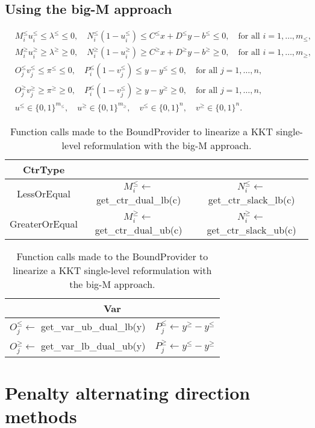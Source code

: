 \subsection{Using the big-M approach}

\begin{align*}
    & M_i^\le u^\le_i \le \lambda^\le \le 0, 
    \quad N_i^\le(1 - u_i^\le) \le C^\le x + D^\le y - b^\le \le 0,  \quad \text{for all } i=1,\dotsc,m_\le,\\
    & M_i^\ge u^\ge_i \ge \lambda^\ge \ge 0, 
    \quad N_i^\ge(1 - u_i^\ge) \ge C^\ge x + D^\ge y - b^\ge \ge 0,  \quad \text{for all } i=1,\dotsc,m_\ge,\\
    & O_j^\le v_j^\le \le \pi^\le \le 0, 
    \quad P_i^\le(1 - v_j^\le) \le y - y^\le \le 0, \quad \text{for all }j=1,\dotsc,n, \\
    & O_j^\ge v_j^\ge \ge \pi^\ge \ge 0, 
    \quad P_i^\le(1 - v_j^\le) \ge y - y^\ge \ge 0, \quad \text{for all }j=1,\dotsc,n, \\
    & u^\le\in\{0,1\}^{m_\le}, \quad u^\ge\in\{0,1\}^{m_\ge}, \quad 
    v^\le\in\{0,1\}^{n}, \quad v^\ge\in\{0,1\}^{n}.
\end{align*}

\begin{table}
    \centering 

    \begin{tabular}{ccc}
        \toprule
        \textsf{CtrType} \\\midrule
        \textsf{LessOrEqual} 
        & $M_i^\le \gets $ \textsf{get\_ctr\_dual\_lb(c)}
        & $N_i^\le \gets $ \textsf{get\_ctr\_slack\_lb(c)} \\
        \textsf{GreaterOrEqual} 
        & $M_i^\ge \gets $ \textsf{get\_ctr\_dual\_ub(c)}
        & $N_i^\ge \gets $ \textsf{get\_ctr\_slack\_ub(c)} \\\bottomrule
    \end{tabular}

    \vspace{.5cm}
    
    \begin{tabular}{ll}
        \toprule
        \multicolumn{2}{c}{\textsf{Var}} \\\midrule
        $O_j^\le\gets$ \textsf{get\_var\_ub\_dual\_lb(y)}
        & $P_j^\le\gets y^\ge - y^\le$ \\
        $O_j^\ge\gets$ \textsf{get\_var\_lb\_dual\_ub(y)}
        & $P_j^\ge\gets  y^\le - y^\ge$ \\\bottomrule
    \end{tabular}

    \caption{Function calls made to the \textsf{BoundProvider} to linearize a KKT single-level reformulation with the big-M approach.}
\end{table}

\section{Penalty alternating direction methods}
